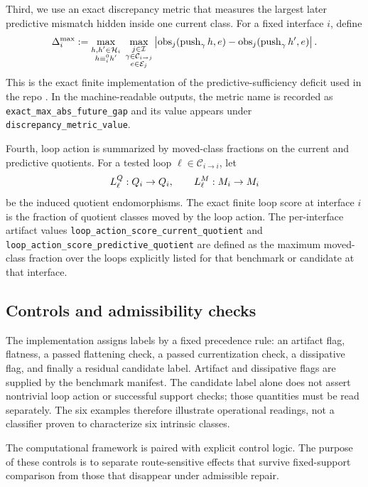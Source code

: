 \documentclass[11pt]{article}
\theoremstyle{definition}
\begin{document}
Third, we use an exact discrepancy metric that measures the largest later predictive mismatch hidden inside one current class. For a fixed interface $i$, define
\begin{equation}
\Delta_i^{\max}
:=
\max_{\substack{h,h'\in\mathcal{H}_i\\ h \equiv^{0}_i h'}}
\;
\max_{\substack{j\in\mathcal{I}\\ \gamma\in\mathcal{C}_{i\to j}\\ e\in\mathcal{E}_j}}
\left|
\operatorname{obs}_j(\operatorname{push}_{\gamma} h,e)
-
\operatorname{obs}_j(\operatorname{push}_{\gamma} h',e)
\right|.
\label{eq:exact-max-gap}
\end{equation}
This is the exact finite implementation of the predictive-sufficiency deficit used in the repo \citep{Tsiokos2026CastStone}. In the machine-readable outputs, the metric name is recorded as \nolinkurl{exact_max_abs_future_gap} and its value appears under \nolinkurl{discrepancy_metric_value}.

Fourth, loop action is summarized by moved-class fractions on the current and predictive quotients. For a tested loop $\ell\in\mathcal{C}_{i\to i}$, let
\[
L^{Q}_{\ell} : Q_i \to Q_i,
\qquad
L^{M}_{\ell} : M_i \to M_i
\]
be the induced quotient endomorphisms. The exact finite loop score at interface $i$ is the fraction of quotient classes moved by the loop action. The per-interface artifact values
\nolinkurl{loop_action_score_current_quotient}
and
\nolinkurl{loop_action_score_predictive_quotient}
are defined as the maximum moved-class fraction over the loops explicitly listed for that benchmark or candidate at that interface.

\subsection{Controls and admissibility checks}\label{subsec:eff-controls}
The implementation assigns labels by a fixed precedence rule: an artifact flag, flatness, a passed flattening check, a passed currentization check, a dissipative flag, and finally a residual candidate label. Artifact and dissipative flags are supplied by the benchmark manifest. The candidate label alone does not assert nontrivial loop action or successful support checks; those quantities must be read separately. The six examples therefore illustrate operational readings, not a classifier proven to characterize six intrinsic classes.

The computational framework is paired with explicit control logic. The purpose of these controls is to separate route-sensitive effects that survive fixed-support comparison from those that disappear under admissible repair.
\end{document}
